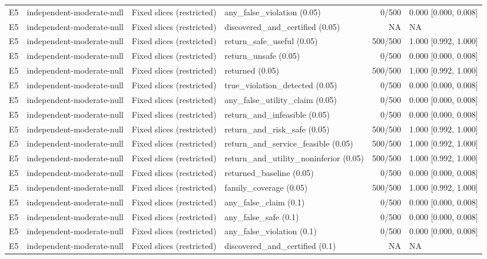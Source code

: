 \begin{longtable}{p{.04\linewidth}p{.18\linewidth}p{.19\linewidth}p{.16\linewidth}r p{.21\linewidth}}
E5 & independent-moderate-null & Fixed slices (restricted) & any\_false\_violation (0.05) & 0/500 & 0.000 [0.000, 0.008]\\
E5 & independent-moderate-null & Fixed slices (restricted) & discovered\_and\_certified (0.05) & NA & NA\\
E5 & independent-moderate-null & Fixed slices (restricted) & return\_safe\_useful (0.05) & 500/500 & 1.000 [0.992, 1.000]\\
E5 & independent-moderate-null & Fixed slices (restricted) & return\_unsafe (0.05) & 0/500 & 0.000 [0.000, 0.008]\\
E5 & independent-moderate-null & Fixed slices (restricted) & returned (0.05) & 500/500 & 1.000 [0.992, 1.000]\\
E5 & independent-moderate-null & Fixed slices (restricted) & true\_violation\_detected (0.05) & 0/500 & 0.000 [0.000, 0.008]\\
E5 & independent-moderate-null & Fixed slices (restricted) & any\_false\_utility\_claim (0.05) & 0/500 & 0.000 [0.000, 0.008]\\
E5 & independent-moderate-null & Fixed slices (restricted) & return\_and\_infeasible (0.05) & 0/500 & 0.000 [0.000, 0.008]\\
E5 & independent-moderate-null & Fixed slices (restricted) & return\_and\_risk\_safe (0.05) & 500/500 & 1.000 [0.992, 1.000]\\
E5 & independent-moderate-null & Fixed slices (restricted) & return\_and\_service\_feasible (0.05) & 500/500 & 1.000 [0.992, 1.000]\\
E5 & independent-moderate-null & Fixed slices (restricted) & return\_and\_utility\_noninferior (0.05) & 500/500 & 1.000 [0.992, 1.000]\\
E5 & independent-moderate-null & Fixed slices (restricted) & returned\_baseline (0.05) & 0/500 & 0.000 [0.000, 0.008]\\
E5 & independent-moderate-null & Fixed slices (restricted) & family\_coverage (0.05) & 500/500 & 1.000 [0.992, 1.000]\\
E5 & independent-moderate-null & Fixed slices (restricted) & any\_false\_claim (0.1) & 0/500 & 0.000 [0.000, 0.008]\\
E5 & independent-moderate-null & Fixed slices (restricted) & any\_false\_safe (0.1) & 0/500 & 0.000 [0.000, 0.008]\\
E5 & independent-moderate-null & Fixed slices (restricted) & any\_false\_violation (0.1) & 0/500 & 0.000 [0.000, 0.008]\\
E5 & independent-moderate-null & Fixed slices (restricted) & discovered\_and\_certified (0.1) & NA & NA\\

\end{longtable}
